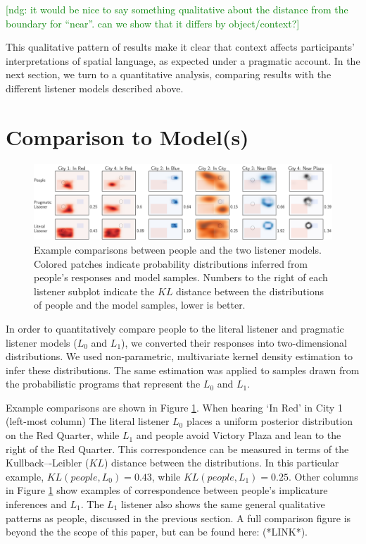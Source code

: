 \documentclass[10pt,letterpaper]{article}
\newcommand{\ndg}[1]{\textcolor{Green}{[ndg: #1]}}
\begin{document}
\ndg{it would be nice to say something qualitative about the distance from the boundary for ``near''. can we show that it differs by object/context?}

This qualitative pattern of results make it clear that context affects participants' interpretations of spatial language, as expected under a pragmatic account.
In the next section, we turn to a quantitative analysis, comparing results with the different listener models described above. 

\section{Comparison to Model(s)}

\begin{figure}[!t]
\center
\includegraphics[width=\textwidth]{figures/Figure4.pdf}
\caption{Example comparisons between people and the two listener models. Colored patches indicate probability distributions inferred from people's responses and model samples. Numbers to the right of each listener subplot indicate the $KL$ distance between the distributions of people and the model samples, lower is better.}
\label{fig:modelExamples}
\end{figure}

In order to quantitatively compare people to the literal listener and pragmatic listener models ($L_0$ and $L_1$), we converted their responses into two-dimensional distributions. We used non-parametric, multivariate kernel density estimation to infer these distributions. The same estimation was applied to samples drawn from the probabilistic programs that represent the $L_0$ and $L_1$. 

Example comparisons are shown in Figure \ref{fig:modelExamples}. When hearing `In Red' in City 1 (left-most column) The literal listener $L_0$ places a uniform posterior distribution on the Red Quarter, while $L_1$ and people avoid Victory Plaza and lean to the right of the Red Quarter. This correspondence can be measured in terms of the Kullback–-Leibler ($KL$) distance between the distributions. In this particular example, $KL(people, L_0) = 0.43$, while $KL(people, L_1) = 0.25$. Other columns in Figure \ref{fig:modelExamples} show examples of correspondence between people's implicature inferences and $L_1$. The $L_1$ listener also shows the same general qualitative patterns as people, discussed in the previous section. A full comparison figure is beyond the the scope of this paper, but can be found here: (*LINK*).
\end{document}
